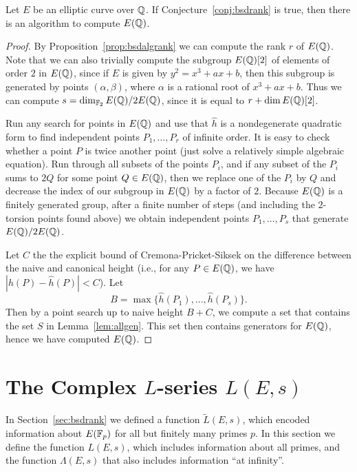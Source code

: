 \begin{proposition}
Let $E$ be an elliptic curve over $\mathbb{Q}$. 
 If Conjecture~\ref{conj:bsdrank} is true, then 
there is an algorithm to compute $E(\mathbb{Q})$.
\end{proposition}
\begin{proof}
  By Proposition~\ref{prop:bsdalgrank} we can compute the rank $r$ of
  $E(\mathbb{Q})$.  Note that we can also trivially compute the subgroup
  $E(\mathbb{Q})[2]$ of elements of order $2$ in $E(\mathbb{Q})$, since if $E$ is
  given by $y^2=x^3+ax+b$, then this subgroup is generated by points
  $(\alpha, \beta)$, where $\alpha$ is a rational root of $x^3+ax+b$.
  Thus we can compute $s = \dim_{\mathbb{F}_2} E(\mathbb{Q})/2 E(\mathbb{Q})$, since it is equal to $r
  + \dim E(\mathbb{Q})[2]$.  

  Run any search for points in $E(\mathbb{Q})$ and use that $\hat{h}$ is a
  nondegenerate quadratic form to find independent points $P_1,\ldots,
  P_r$ of infinite order.  It is easy to check whether a point $P$ is
  twice another point (just solve a relatively simple algebraic
  equation).  Run through all subsets of the points $P_i$, and if any
  subset of the $P_i$ sums to $2Q$ for some point $Q\in E(\mathbb{Q})$, then we
  replace one of the $P_i$ by $Q$ and decrease the index of
  our subgroup in $E(\mathbb{Q})$ by a factor of $2$.  Because $E(\mathbb{Q})$ is a
  finitely generated group, after a finite number of steps (and
  including the $2$-torsion points found above) we obtain independent
  points $P_1,\ldots, P_s$ that generate $E(\mathbb{Q})/2 E(\mathbb{Q})$.

  Let $C$ the the explicit bound of Cremona-Pricket-Siksek on the
  difference between the naive and canonical height (i.e., for any
   $P \in E(\mathbb{Q})$, we have $|h(P) - \hat{h}(P)| < C$). 
Let
 $$
    B = \max\{\hat{h}(P_1), \ldots, \hat{h}(P_s)\}.
$$
Then by a point search up to naive height $B+C$, we compute a set that
contains the set $S$ in Lemma~\ref{lem:allgen}.  This set
then contains generators for $E(\mathbb{Q})$, hence we have computed $E(\mathbb{Q})$.

   \end{proof}

\section{The Complex $L$-series $L(E,s)$}\label{sec:complexles}
In Section~\ref{sec:bsdrank} we defined a function $\tilde{L}(E,s)$,
which encoded information about $E(\mathbb{F}_p)$ for all but finitely
many primes $p$.  In this section we define the function $L(E,s)$,
which includes information about all primes, and the function
$\Lambda(E,s)$ that also includes information ``at infinity''. 


